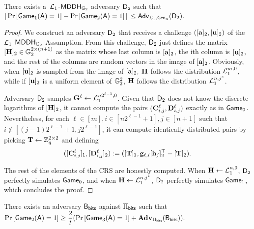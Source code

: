 \begin{lemma} There exists a\ \(\mathcal{L}_1\)-\(\mathsf{MDDH}_{\mathbb{G}_2}\) adversary \(\mathsf{D}_2\) such that
\(|\Pr\left[\allowbreak\mathsf{Game}_{1}(\advA)\allowbreak=1\right]\linebreak-\Pr\left[\mathsf{Game}_{2}(\advA)=1\right]|\) \(\leq \mathsf{Adv}_{\mathcal{L}_1,\mathsf{Gen}_a}(\mathsf{D}_2).\)
\end{lemma}
\begin{proof}
We construct an adversary \(\mathsf{D}_2\) that receives 
a challenge \(([\mathbf{a}]_2,[\mathbf{u}]_2)\) of the 
\(\mathcal{L}_1\)-\(\mathsf{MDDH}_{\mathbb{G}_2}\) Assumption. From this challenge, \(\mathsf{D}_2\) just defines the matrix  \([\mathbf{{H}}]_2\in\mathbb{G}_2^{2\times(n+1)}\) as the matrix whose last column is \([\mathbf{a}]_2\), the ith column is \([\mathbf{u}]_2\), and the rest of the columns are random vectors in the image of \([\mathbf{a}]_2\). 
Obviously, when \([\mathbf{u}]_2\) is sampled from 
the image of \([\mathbf{a}]_2,\) \(\mathbf{{H}}\) follows the distribution \(\mathcal{L}_1^{m,0}\), while if \([\mathbf{u}]_2\) is a uniform element of \(\mathbb{G}^2_2\), \(\mathbf{{H}}\) follows the distribution \(\mathcal{L}_1^{n,j^*}\). 
 
Adversary \(\mathsf{D}_2\) samples
\(\mathbf{{G}}^\ell \gets \mathcal{L}_1^{n2^{\ell-1},0}\). Given that \(\mathsf{D}_2\) does not know the discrete logarithms of \([\mathbf{{H}}]_2\), it cannot compute the pairs \((\mathbf{{C}}^\ell_{i,j},\mathbf{{D}}^\ell_{i,j})\) exactly as in \(\mathsf{Game}_0\). Nevertheless, for each \(\ell\in[m],i\in[n2^{\ell-1}+1],j\in[n+1]\) such that $i\notin[(j-1)2^{\ell-1}+1,j2^{\ell-1}]$, it can compute identically distributed pairs by picking \(\mathbf{{T}}\gets\mathbb{Z}_q^{2\times 2}\) and defining
\[
([\mathbf{{C}}^\ell_{i,j}]_1,[\mathbf{{D}}^\ell_{i,j}]_2):=([\mathbf{{T}}]_1,\mathbf{g}_{\ell,i}[\mathbf{h}_j]_2^\top-[\mathbf{{T}}]_2).
\]

The rest of the elements of the CRS are honestly computed. When \(\mathbf{{H}}\gets\mathcal{L}_1^{n,0}\), \(\mathsf{D}_2\) perfectly simulates \(\mathsf{Game}_0\), and when \(\mathbf{{H}}\gets\mathcal{L}_1^{n,j^*}\), \(\mathsf{D}_2\) perfectly simulates \(\mathsf{Game}_1\), which concludes the proof. 
\end{proof}

\begin{lemma} There exists an adversary \(\mathsf{B}_{\mathsf{bits}}\) against \(\Pi_{\mathsf{bits}}\) such that
\(\Pr\left[\allowbreak \mathsf{Game}_2(\mathsf{A})\allowbreak =1\right]\geq\dfrac{2}{t }(\Pr\left[\mathsf{Game}_3(\mathsf{A})=1\right]+\mathbf{Adv}_{\Pi_{\mathsf{bits}}}(\mathsf{B}_{\mathsf{bits}})).\)
\end{lemma}

